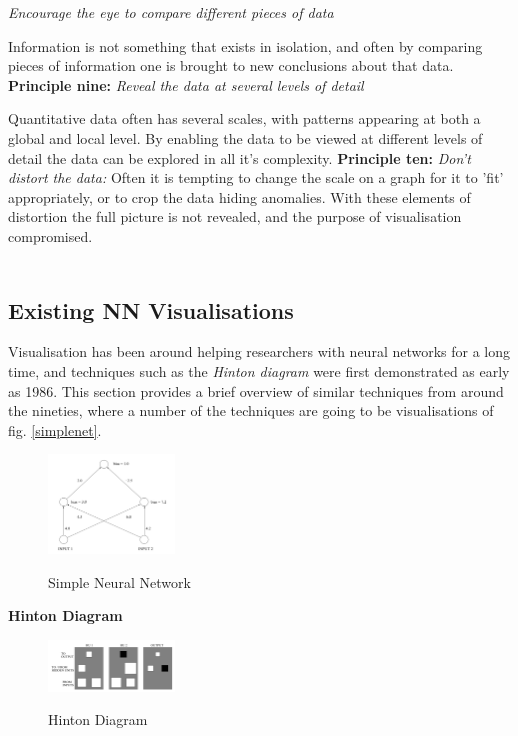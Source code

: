 \documentclass[a4paper,11pt,titlepage]{article}
\begin{document}
	\textit{Encourage the eye to compare different pieces of data}
	\par 
	Information is not something that exists in isolation, and often by comparing pieces of information one is brought to new conclusions about that data.
	\textbf{Principle nine:}
	\textit{Reveal the data at several levels of detail}
	\par 
	Quantitative data often has several scales, with patterns appearing at both a global and local level. By enabling the data to be viewed at different levels of detail the data can be explored in all it's complexity.
	\textbf{Principle ten:}
	\textit{Don't distort the data:}
	Often it is tempting to change the scale on a graph for it to 'fit' appropriately, or to crop the data hiding anomalies. With these elements of distortion the full picture is not revealed, and the purpose of visualisation compromised. 
\\\
\subsection{Existing NN Visualisations}
		
	 Visualisation has been around helping researchers with neural networks for a long time, and techniques such as the \textit{Hinton diagram} were first demonstrated as early as 1986. This section provides a brief overview of similar techniques from around the nineties, where a number of the techniques are going to be visualisations of fig. \ref{simplenet}.
	 
	 	\begin{figure}[H]
    			\centering	
			{{\includegraphics[width=0.3\textwidth]
    				{img/craven_simple_net.png} 
    			}}%
    			\caption{Simple Neural Network}%
    		\label{fig:simplenet}
	\end{figure} 	
		
\textbf{Hinton Diagram}

		 		
 	\begin{figure}[H]
    			\centering	
			{{\includegraphics[width=0.3\textwidth]
    				{img/craven_hinton.png} 
    			}}%
    			\caption{Hinton Diagram}%
    		\label{fig:simple}
	\end{figure} 
 		
\end{document}
